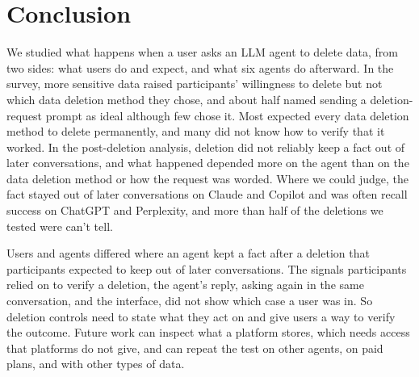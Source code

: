 \section{Conclusion}
\label{sec:conclusion}

We studied what happens when a user asks an LLM agent to delete data, from two sides: what users do and expect, and what six agents do afterward. In the survey, more sensitive data raised participants' willingness to delete but not which data deletion method they chose, and about half named sending a deletion-request prompt as ideal although few chose it. Most expected every data deletion method to delete permanently, and many did not know how to verify that it worked. In the post-deletion analysis, deletion did not reliably keep a fact out of later conversations, and what happened depended more on the agent than on the data deletion method or how the request was worded. Where we could judge, the fact stayed out of later conversations on Claude and Copilot and was often recall success on ChatGPT and Perplexity, and more than half of the deletions we tested were can't tell.

Users and agents differed where an agent kept a fact after a deletion that participants expected to keep out of later conversations. The signals participants relied on to verify a deletion, the agent's reply, asking again in the same conversation, and the interface, did not show which case a user was in. So deletion controls need to state what they act on and give users a way to verify the outcome. Future work can inspect what a platform stores, which needs access that platforms do not give, and can repeat the test on other agents, on paid plans, and with other types of data.

